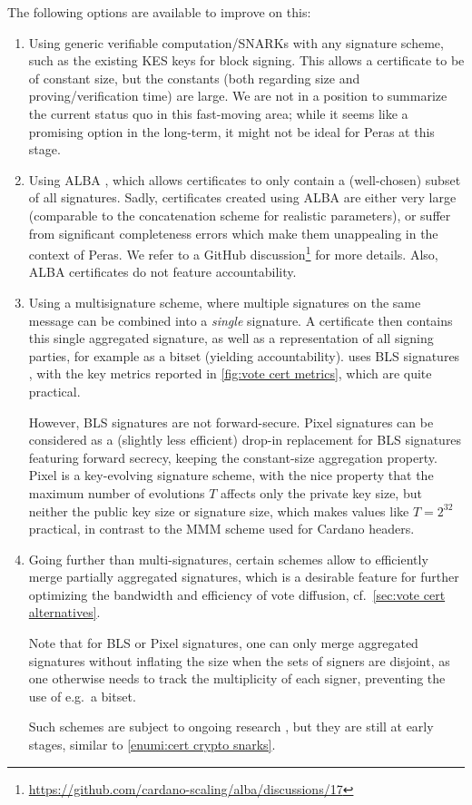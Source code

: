 The following options are available to improve on this:
\begin{enumerate}
\item\label{enumi:cert crypto snarks}
  Using generic verifiable computation/SNARKs with any signature scheme, such as the existing KES keys for block signing.
  This allows a certificate to be of constant size, but the constants (both regarding size and proving/verification time) are large.
  We are not in a position to summarize the current status quo in this fast-moving area; while it seems like a promising option in the long-term, it might not be ideal for Peras at this stage.
\item
  Using ALBA \parencite{chaidos2024approximate}, which allows certificates to only contain a (well-chosen) subset of all signatures.
  Sadly, certificates created using ALBA are either very large (comparable to the concatenation scheme for realistic parameters), or suffer from significant completeness errors which make them unappealing in the context of Peras.
  We refer to a GitHub discussion\footnote{\url{https://github.com/cardano-scaling/alba/discussions/17}} for more details.
  Also, ALBA certificates do not feature accountability.
\item
  Using a multisignature scheme, where multiple signatures on the same message can be combined into a \emph{single} signature.
  A certificate then contains this single aggregated signature, as well as a representation of all signing parties, for example as a bitset (yielding accountability).
  \Cite{peras-cert-report} uses BLS signatures \parencite{boneh2004short}, with the key metrics reported in \cref{fig:vote cert metrics}, which are quite practical.

  However, BLS signatures are not forward-secure.
  Pixel signatures \parencite{drijvers2020pixel} can be considered as a (slightly less efficient) drop-in replacement for BLS signatures featuring forward secrecy, keeping the constant-size aggregation property.
  Pixel is a key-evolving signature scheme, with the nice property that the maximum number of evolutions $T$ affects only the private key size, but neither the public key size or signature size, which makes values like $T = 2^{32}$ practical, in contrast to the MMM scheme \parencite{malkin2001composition} used for Cardano headers.
\item
  Going further than multi-signatures, certain schemes allow to efficiently merge partially aggregated signatures, which is a desirable feature for further optimizing the bandwidth and efficiency of vote diffusion, cf.\ \cref{sec:vote cert alternatives}.

  Note that for BLS or Pixel signatures, one can only merge aggregated signatures without inflating the size when the sets of signers are disjoint, as one otherwise needs to track the multiplicity of each signer, preventing the use of e.g.\ a bitset.

  Such schemes are subject to ongoing research \parencite{signature-merging,cryptoeprint:2025/144}, but they are still at early stages, similar to \ref{enumi:cert crypto snarks}.
\end{enumerate}

